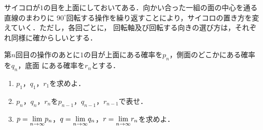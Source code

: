 \documentclass[a4j]{jarticle}
\begin{document}

\preEqlabel{$\cdots$}
     \begin{oframed}
     サイコロが$1$の目を上面にしておいてある．向かい合った一組の面の中心を通る直線のまわりに
     $90^\circ$回転する操作を繰り返すことにより，サイコロの置き方を変えていく．ただし，各回ごとに，
     回転軸及び回転する向きの選び方は，それぞれ同様に確からしいとする．
      
     第$n$回目の操作のあとに$1$の目が上面にある確率を$p_n$，側面のどこかにある確率を$q_n$，底面
     にある確率を$r_n$とする．
          \begin{enumerate}[(1)]
          \item $p_1$，$q_1$，$r_1$を求めよ．
          \item $p_n$，$q_n$，$r_n$を$p_{n-1}$，$q_{n-1}$，$r_{n-1}$で表せ．
          \item $p={\displaystyle \lim_{n\to\infty}}p_n$，$q={\displaystyle \lim_{n\to\infty}}q_n$，$r={\displaystyle \lim_{n\to\infty}}r_n$を求めよ．
          \end{enumerate}
     \end{oframed}
\end{document}
